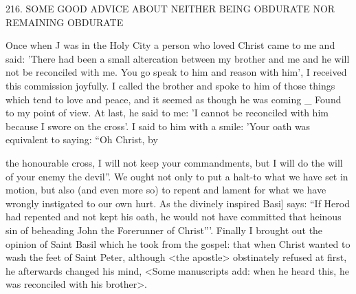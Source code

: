 216.
SOME GOOD ADVICE
ABOUT NEITHER BEING OBDURATE
NOR REMAINING OBDURATE

Once when J was in the Holy City a person who loved Christ came
to me and said: 'There had been a small altercation between my
brother and me and he will not be reconciled with me.
You go
speak to him and reason with him', I received this commission
joyfully.
I called the brother and spoke to him of those things which
tend to love and peace, and it seemed as though he was coming
\_ Found to my point of view.
At last, he said to me: 'I cannot be
reconciled with him because I swore on the cross'.
I said to him
with a smile: 'Your oath was equivalent to saying: “Oh Christ, by

the honourable cross, I will not keep your commandments, but I
will do the will of your enemy the devil”.
We ought not only to put
a halt-to what we have set in motion, but also (and even more so)
to repent and lament for what we have wrongly instigated to our
own hurt.
As the divinely inspired Basi] says: “If Herod had
repented and not kept his oath, he would not have committed that
heinous sin of beheading John the Forerunner of Christ”'.
Finally
I brought out the opinion of Saint Basil which he took from the
gospel: that when Christ wanted to wash the feet of Saint Peter,
although <the apostle> obstinately refused at first, he afterwards
changed his mind, <Some manuscripts add: when he heard this, he
was reconciled with his brother>.

